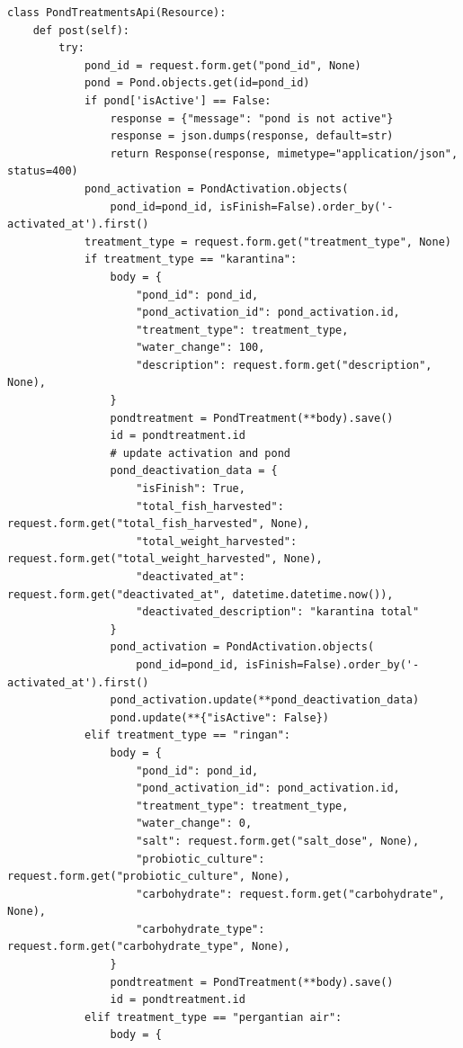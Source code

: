 \begin{enumerate}[1.]
\begin{lstlisting}
class PondTreatmentsApi(Resource):
    def post(self):
        try:
            pond_id = request.form.get("pond_id", None)
            pond = Pond.objects.get(id=pond_id)
            if pond['isActive'] == False:
                response = {"message": "pond is not active"}
                response = json.dumps(response, default=str)
                return Response(response, mimetype="application/json", status=400)
            pond_activation = PondActivation.objects(
                pond_id=pond_id, isFinish=False).order_by('-activated_at').first()
            treatment_type = request.form.get("treatment_type", None)
            if treatment_type == "karantina":
                body = {
                    "pond_id": pond_id,
                    "pond_activation_id": pond_activation.id,
                    "treatment_type": treatment_type,
                    "water_change": 100,
                    "description": request.form.get("description", None),
                }
                pondtreatment = PondTreatment(**body).save()
                id = pondtreatment.id
                # update activation and pond
                pond_deactivation_data = {
                    "isFinish": True,
                    "total_fish_harvested": request.form.get("total_fish_harvested", None),
                    "total_weight_harvested": request.form.get("total_weight_harvested", None),
                    "deactivated_at": request.form.get("deactivated_at", datetime.datetime.now()),
                    "deactivated_description": "karantina total"
                }
                pond_activation = PondActivation.objects(
                    pond_id=pond_id, isFinish=False).order_by('-activated_at').first()
                pond_activation.update(**pond_deactivation_data)
                pond.update(**{"isActive": False})
            elif treatment_type == "ringan":
                body = {
                    "pond_id": pond_id,
                    "pond_activation_id": pond_activation.id,
                    "treatment_type": treatment_type,
                    "water_change": 0,
                    "salt": request.form.get("salt_dose", None),
                    "probiotic_culture": request.form.get("probiotic_culture", None),
                    "carbohydrate": request.form.get("carbohydrate", None),
                    "carbohydrate_type": request.form.get("carbohydrate_type", None),
                }
                pondtreatment = PondTreatment(**body).save()
                id = pondtreatment.id
            elif treatment_type == "pergantian air":
                body = {

\end{lstlisting}
\end{enumerate}
